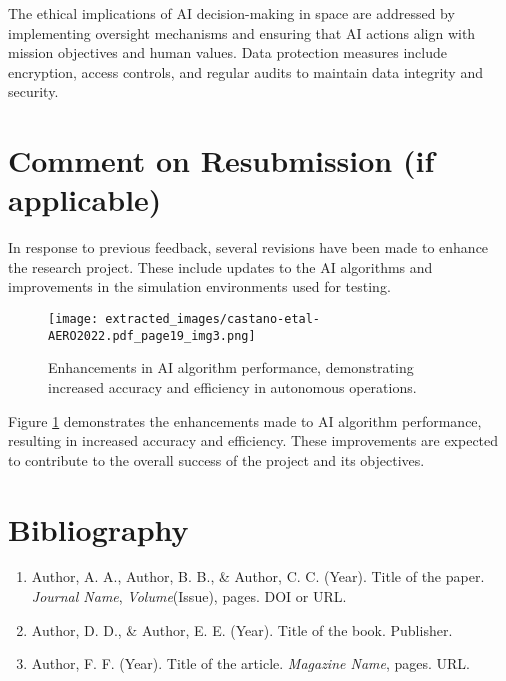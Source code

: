 \documentclass[12pt]{article}
\begin{document}
The ethical implications of AI decision-making in space are addressed by implementing oversight mechanisms and ensuring that AI actions align with mission objectives and human values. Data protection measures include encryption, access controls, and regular audits to maintain data integrity and security.

\section{Comment on Resubmission (if applicable)}
In response to previous feedback, several revisions have been made to enhance the research project. These include updates to the AI algorithms and improvements in the simulation environments used for testing.

\begin{figure}[htbp]
    \centering
    \texttt{[image: extracted\_images/castano-etal-AERO2022.pdf\_page19\_img3.png]}
    \caption{Enhancements in AI algorithm performance, demonstrating increased accuracy and efficiency in autonomous operations.}
    \label{fig:ai_enhancements}
\end{figure}

Figure \ref{fig:ai_enhancements} demonstrates the enhancements made to AI algorithm performance, resulting in increased accuracy and efficiency. These improvements are expected to contribute to the overall success of the project and its objectives.

\section{Bibliography}
\begin{enumerate}
    \item Author, A. A., Author, B. B., \& Author, C. C. (Year). Title of the paper. \textit{Journal Name}, \textit{Volume}(Issue), pages. DOI or URL.
    \item Author, D. D., \& Author, E. E. (Year). Title of the book. Publisher.
    \item Author, F. F. (Year). Title of the article. \textit{Magazine Name}, pages. URL.
\end{enumerate}
\end{document}
